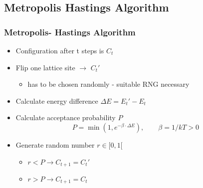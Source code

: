 \documentclass{beamer}
\begin{document}
\subsection{Metropolis Hastings Algorithm}
\begin{frame}\frametitle{Metropolis- Hastings Algorithm}
\begin{itemize}
\item Configuration after t steps is $C_t$
\item Flip one lattice site $\rightarrow$ $C_t'$
\begin{itemize}
\item  has to be chosen randomly - suitable RNG necessary
\end{itemize}
\item Calculate energy difference $\Delta E = E_t' - E_t$
\item Calculate acceptance probability $P$
\begin{equation*}
P = \operatorname{min}\left(1,e^{-\beta\cdot \Delta E}\right),\qquad \beta = 1/kT > 0 
\end{equation*}
\item Generate random number $r \in [0,1[$
\begin{itemize}
\item $r<P \rightarrow C_{t+1} = C_t'$ 
\item $r>P \rightarrow C_{t+1} = C_t$ 
\end{itemize}
\end{itemize}
\end{frame}
\end{document}
